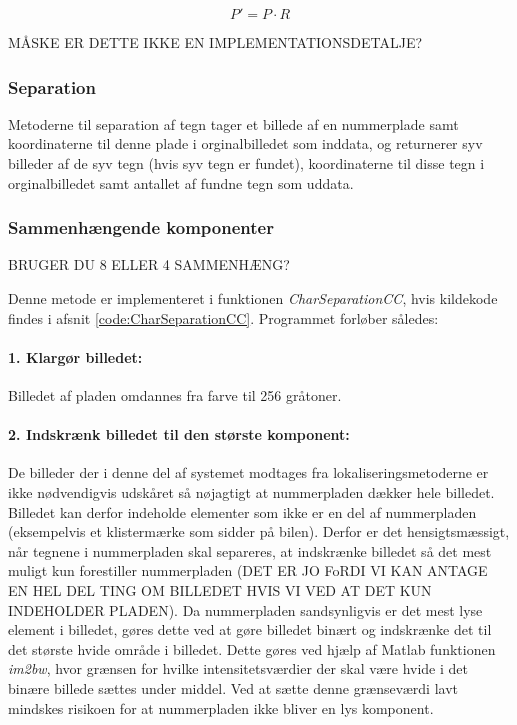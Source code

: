 \begin{displaymath}
P' = P \cdot R
\end{displaymath}

MÅSKE ER DETTE IKKE EN IMPLEMENTATIONSDETALJE?

\subsubsection{Separation}

Metoderne til separation af tegn tager et billede af en nummerplade samt koordinaterne til denne plade i orginalbilledet som inddata, og returnerer syv billeder af de syv tegn (hvis syv tegn er fundet), koordinaterne til disse tegn i orginalbilledet samt antallet af fundne tegn som uddata.

\subsubsection*{Sammenhængende komponenter}
BRUGER DU 8 ELLER 4 SAMMENHÆNG?

Denne metode er implementeret i funktionen \textit{CharSeparationCC}, hvis kildekode findes i afsnit \vref{code:CharSeparationCC}. Programmet forløber således:

\paragraph{1. Klargør billedet:} Billedet af pladen omdannes fra farve til 256 gråtoner. 

\paragraph{2. Indskrænk billedet til den største komponent:}
De billeder der i denne del af systemet modtages fra lokaliseringsmetoderne er ikke nødvendigvis udskåret så nøjagtigt at nummerpladen dækker hele billedet. Billedet kan derfor indeholde elementer som ikke er en del af nummerpladen (eksempelvis et klistermærke som sidder på bilen). Derfor er det hensigtsmæssigt, når tegnene i nummerpladen skal separeres, at indskrænke billedet så det mest muligt kun forestiller nummerpladen (DET ER JO FoRDI VI KAN ANTAGE EN HEL DEL TING OM BILLEDET HVIS VI VED AT DET KUN INDEHOLDER PLADEN). Da nummerpladen sandsynligvis er det mest lyse element i billedet, gøres dette ved at gøre billedet binært og indskrænke det til det største hvide område i billedet. Dette gøres ved hjælp af Matlab funktionen \textit{im2bw}, hvor grænsen for hvilke intensitetsværdier der skal være hvide i det binære billede sættes under middel. Ved at sætte denne grænseværdi lavt mindskes risikoen for at nummerpladen ikke bliver en lys komponent.

